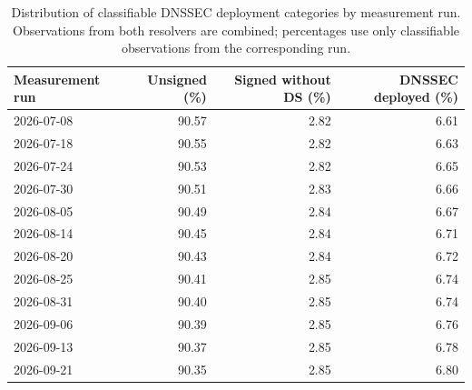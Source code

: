 \begin{table}[H]
    \centering
    \small
    \caption{Distribution of classifiable DNSSEC deployment categories by measurement run. Observations from both resolvers are combined; percentages use only classifiable observations from the corresponding run.}
    \label{tab:classification-over-time}
    \begin{tabular}{@{}lrrr@{}}
        \toprule
        Measurement run & Unsigned (\%) & Signed without DS (\%) & DNSSEC deployed (\%) \\
        \midrule
        2026-07-08 & 90.57 & 2.82 & 6.61 \\
        2026-07-18 & 90.55 & 2.82 & 6.63 \\
        2026-07-24 & 90.53 & 2.82 & 6.65 \\
        2026-07-30 & 90.51 & 2.83 & 6.66 \\
        2026-08-05 & 90.49 & 2.84 & 6.67 \\
        2026-08-14 & 90.45 & 2.84 & 6.71 \\
        2026-08-20 & 90.43 & 2.84 & 6.72 \\
        2026-08-25 & 90.41 & 2.85 & 6.74 \\
        2026-08-31 & 90.40 & 2.85 & 6.74 \\
        2026-09-06 & 90.39 & 2.85 & 6.76 \\
        2026-09-13 & 90.37 & 2.85 & 6.78 \\
        2026-09-21 & 90.35 & 2.85 & 6.80 \\
        \bottomrule
    \end{tabular}
\end{table}

